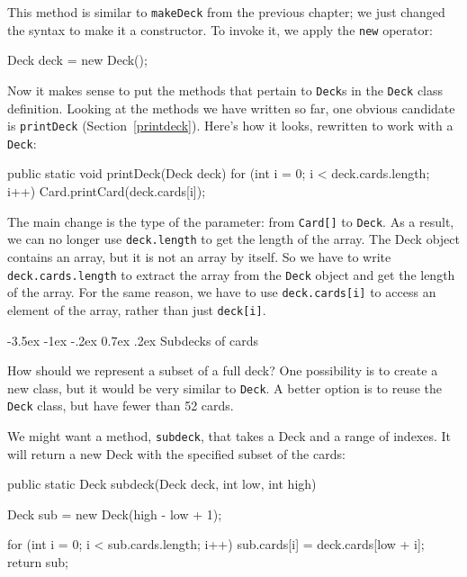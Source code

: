 \documentclass[12pt]{book}
\makeatletter
\theoremstyle{exercise}
\newcommand{\java}[1]{\verb"#1"}
\renewcommand{\section}{\@startsection {section}{1}{\z@}%
    {-3.5ex \@plus -1ex \@minus -.2ex}%
    {0.7ex \@plus.2ex}%
    {\normalfont\Large\bfseries}}
\newcommand{\java}[1]{\lstinline{#1}} %
\makeatother
\begin{document}

This method is similar to \java{makeDeck} from the previous chapter; we just changed the syntax to make it a constructor.
To invoke it, we apply the \java{new} operator:

\begin{code}
    Deck deck = new Deck();
\end{code}


Now it makes sense to put the methods that pertain to \java{Deck}s in the \java{Deck} class definition.
Looking at the methods we have written so far, one obvious candidate is \java{printDeck} (Section~\ref{printdeck}).
Here's how it looks, rewritten to work with a \java{Deck}:

\begin{code}
    public static void printDeck(Deck deck) {
        for (int i = 0; i < deck.cards.length; i++) {
            Card.printCard(deck.cards[i]);
        }
    }
\end{code}

The main change is the type of the parameter: from \java{Card[]} to \java{Deck}.
As a result, we can no longer use \java{deck.length} to get the length of the array.
The Deck object contains an array, but it is not an array by itself.
So we have to write \java{deck.cards.length} to extract the array from the \java{Deck} object and get the length of the array.
For the same reason, we have to use \java{deck.cards[i]} to access an element of the array, rather than just \java{deck[i]}.


\section{Subdecks of cards}

How should we represent a subset of a full deck?
One possibility is to create a new class, but it would be very similar to \java{Deck}.
A better option is to reuse the \java{Deck} class, but have fewer than 52 cards.

We might want a method, \java{subdeck}, that takes a Deck and a range of indexes.
It will return a new Deck with the specified subset of the cards:

\begin{code}
public static Deck subdeck(Deck deck, int low, int high) {
    Deck sub = new Deck(high - low + 1);

    for (int i = 0; i < sub.cards.length; i++) {
        sub.cards[i] = deck.cards[low + i];
    }
    return sub;
}
\end{code}
\end{document}
